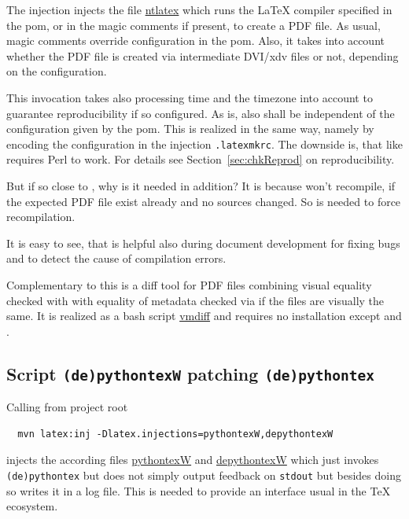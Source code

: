 The injection  
injects the file \href{\urlSite fromMain/ntlatex}{ntlatex} 
which runs the \LaTeX{} compiler specified in the pom, 
or in the magic comments if present, 
to create a PDF file. 
As usual, magic comments override configuration in the pom. 
Also, it takes into account whether the PDF file is created via intermediate DVI/\gls{xdv} files or not, 
depending on the configuration. 

This invocation takes also processing time and the timezone into account 
to guarantee reproducibility if so configured. 
As  is, also  shall be independent 
of the configuration given by the pom. 
This is realized in the same way, 
namely by encoding the configuration in the injection \texttt{.latexmkrc}. 
The downside is, that  like  requires Perl to work. 
For details see Section~\ref{sec:chkReprod} on reproducibility. 

But if  so close to , 
why is it needed in addition? 
It is because  won't recompile, 
if the expected PDF file exist already 
and no sources changed. 
So  is needed to force recompilation. 

It is easy to see, that  is helpful also during document development 
for fixing bugs and to detect the cause of compilation errors. 
\medskip

Complementary to this  is a diff tool for PDF files 
combining visual equality checked with  
with equality of metadata checked via  
if the files are visually the same. 
It is realized as a bash script \href{\urlSite fromMain/ntlatex}{vmdiff} and requires no installation 
except  and . 

\subsection{Script \texttt{(de)pythontexW} patching \texttt{(de)pythontex} }%
\label{subsec:pythontexW}

Calling from project root 
%
\begin{Verbatim}
  mvn latex:inj -Dlatex.injections=pythontexW,depythontexW
\end{Verbatim}
%
injects the according files 
\href{\urlSite fromMain/pythontexW}{pythontexW} and 
\href{\urlSite fromMain/depythontexW}{depythontexW}
which just invokes \texttt{(de)pythontex} %
but does not simply output feedback on \texttt{stdout}
but besides doing so writes it in a log file. 
This is needed to provide an interface usual in the \TeX{} ecosystem. 

